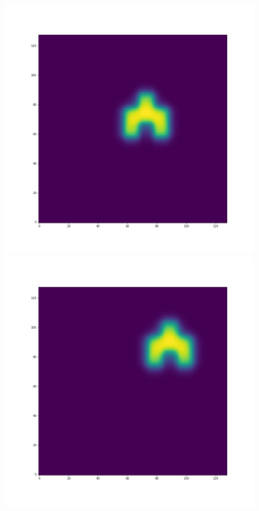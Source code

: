 \documentclass[12pt,a4paper]{article}
\begin{document}
\begin{figure}[H]
\centering
\begin{minipage}{.3\textwidth}
  \centering
  \includegraphics[width=\linewidth]{Pictures/Solve2DWhiteBearMovementTestMUSCL/Solve2DWhiteBearMovementTest_t30.png}
\end{minipage}%
\begin{minipage}{.3\textwidth}
  \centering
  \includegraphics[width=\linewidth]{Pictures/Solve2DWhiteBearMovementTestMUSCL/Solve2DWhiteBearMovementTest_t40.png}

\end{minipage}
\end{figure}
\end{document}

